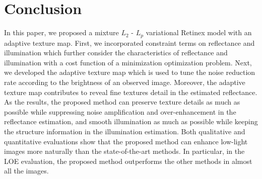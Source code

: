 \chapter{Conclusion} \label{sec:conclusion}
In this paper, we proposed a mixture $L_{2}$ - $L_{p}$ variational Retinex model with an adaptive texture map. First, we incorporated constraint terms on reflectance and illumination which further consider the characteristics of reflectance and illumination with a cost function of a minimization optimization problem. Next, we developed the adaptive texture map which is used to tune the noise reduction rate according to the brightness of an observed image. Moreover, the adaptive texture map contributes to reveal fine textures detail in the estimated reflectance. As the results, the proposed method can preserve texture details as much as possible while suppressing noise amplification and over-enhancement in the reflectance estimation, and smooth illumination as much as possible while keeping the structure information in the illumination estimation. Both qualitative and quantitative evaluations show that the proposed method can enhance low-light images more naturally than the state-of-the-art methods. In particular, in the LOE evaluation, the proposed method outperforms the other methods in almost all the images.